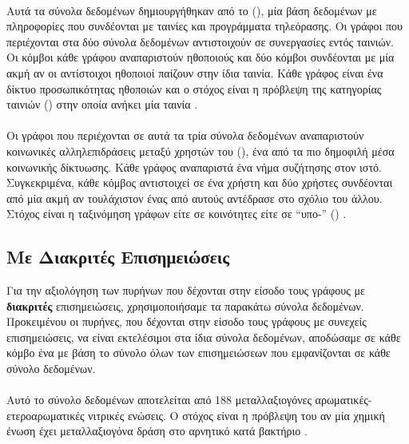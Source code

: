 \paragraph*{}
Αυτά τα σύνολα δεδομένων δημιουργήθηκαν από το  (), μία  βάση δεδομένων με πληροφορίες που συνδέονται με ταινίες και προγράμματα τηλεόρασης.
Οι γράφοι που περιέχονται στα δύο σύνολα δεδομένων αντιστοιχούν σε συνεργασίες εντός ταινιών.
Οι κόμβοι κάθε γράφου αναπαριστούν ηθοποιούς και δύο κόμβοι συνδέονται με μία ακμή αν οι αντίστοιχοι ηθοποιοί παίζουν στην ίδια ταινία.
Κάθε γράφος είναι ένα  δίκτυο προσωπικότητας ηθοποιών και ο στόχος είναι η πρόβλεψη της κατηγορίας ταινιών () στην οποία ανήκει μία ταινία \cite{DGK_PINAR}.

\paragraph*{}
Οι γράφοι που περιέχονται σε αυτά τα τρία σύνολα δεδομένων αναπαριστούν κοινωνικές αλληλεπιδράσεις μεταξύ χρηστών του  (), ένα από τα πιο δημοφιλή μέσα κοινωνικής δίκτυωσης.
Κάθε γράφος αναπαριστά ένα νήμα συζήτησης στον ιστό.
Συγκεκριμένα, κάθε κόμβος αντιστοιχεί σε ένα χρήστη και δύο χρήστες συνδέονται από μία ακμή αν τουλάχιστον ένας από αυτούς αντέδρασε στο σχόλιο του άλλου.
Στόχος είναι η ταξινόμηση γράφων είτε σε κοινότητες είτε σε ``υπο-'' () \cite{DGK_PINAR}.

\subsection{Με Διακριτές Επισημειώσεις}
\label{ssec:lab}
Για την αξιολόγηση των πυρήνων που δέχονται στην είσοδο τους γράφους με \textbf{διακριτές} επισημειώσεις, χρησιμοποιήσαμε τα παρακάτω σύνολα δεδομένων.
Προκειμένου οι πυρήνες, που δέχονται στην είσοδο τους γράφους με συνεχείς επισημειώσεις, να είναι εκτελέσιμοι στα ίδια σύνολα δεδομένων, αποδώσαμε σε κάθε κόμβο ένα  με βάση το σύνολο όλων των επισημειώσεων που εμφανίζονται σε κάθε σύνολο δεδομένων.
\paragraph*{} Αυτό το σύνολο δεδομένων αποτελείται από 188 μεταλλαξιογόνες αρωματικές-ετεροαρωματικές νιτρικές ενώσεις.
Ο στόχος είναι η πρόβλεψη του αν μία χημική ένωση έχει μεταλλαξιογόνα δράση στο αρνητικό κατά  βακτήριο  \cite{shervashidze2011weisfeiler}.

